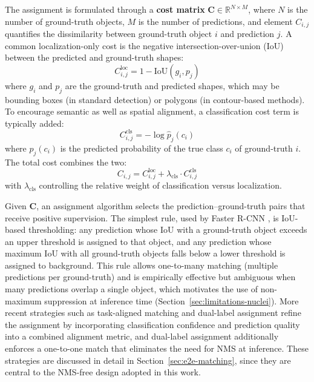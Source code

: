 The assignment is formulated through a \textbf{cost matrix} $\mathbf{C} \in \mathbb{R}^{N \times M}$, where $N$ is the number of ground-truth objects, $M$ is the number of predictions, and element $C_{i,j}$ quantifies the dissimilarity between ground-truth object $i$ and prediction $j$. A common localization-only cost is the negative intersection-over-union (IoU) between the predicted and ground-truth shapes:
\begin{equation}
    C_{i,j}^{\text{loc}} = 1 - \text{IoU}(g_i, p_j)
\end{equation}
where $g_i$ and $p_j$ are the ground-truth and predicted shapes, which may be bounding boxes (in standard detection) or polygons (in contour-based methods). To encourage semantic as well as spatial alignment, a classification cost term is typically added:
\begin{equation}
    C_{i,j}^{\text{cls}} = -\log \hat{p}_j(c_i)
\end{equation}
where $\hat{p}_j(c_i)$ is the predicted probability of the true class $c_i$ of ground-truth $i$. The total cost combines the two:
\begin{equation}
    C_{i,j} = C_{i,j}^{\text{loc}} + \lambda_{\text{cls}} \cdot C_{i,j}^{\text{cls}}
\end{equation}
with $\lambda_{\text{cls}}$ controlling the relative weight of classification versus localization.

Given $\mathbf{C}$, an assignment algorithm selects the prediction--ground-truth pairs that receive positive supervision. The simplest rule, used by Faster R-CNN \cite{ren2015faster}, is IoU-based thresholding: any prediction whose IoU with a ground-truth object exceeds an upper threshold is assigned to that object, and any prediction whose maximum IoU with all ground-truth objects falls below a lower threshold is assigned to background. This rule allows one-to-many matching (multiple predictions per ground-truth) and is empirically effective but ambiguous when many predictions overlap a single object, which motivates the use of non-maximum suppression at inference time (Section~\ref{sec:limitations-nuclei}). More recent strategies such as task-aligned matching and dual-label assignment refine the assignment by incorporating classification confidence and prediction quality into a combined alignment metric, and dual-label assignment additionally enforces a one-to-one match that eliminates the need for NMS at inference. These strategies are discussed in detail in Section~\ref{sec:e2e-matching}, since they are central to the NMS-free design adopted in this work.

